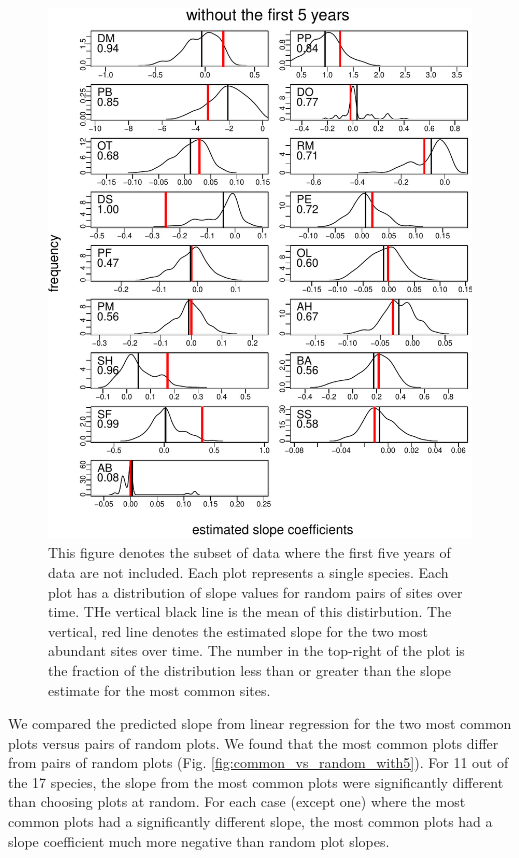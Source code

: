 \documentclass[]{article}
\begin{document}
\begin{figure}[htbp]
\centering
\includegraphics{Empirical_Investigation_files/figure-latex/unnamed-chunk-3-1.pdf}
\caption{This figure denotes the subset of data where the first five
years of data are not included. Each plot represents a single species.
Each plot has a distribution of slope values for random pairs of sites
over time. THe vertical black line is the mean of this distirbution. The
vertical, red line denotes the estimated slope for the two most abundant
sites over time. The number in the top-right of the plot is the fraction
of the distribution less than or greater than the slope estimate for the
most common sites.\label{fig:common_vs_random_without5}}
\end{figure}

We compared the predicted slope from linear regression for the two most
common plots versus pairs of random plots. We found that the most common
plots differ from pairs of random plots (Fig.
\ref{fig:common_vs_random_with5}). For 11 out of the 17 species, the
slope from the most common plots were significantly different than
choosing plots at random. For each case (except one) where the most
common plots had a significantly different slope, the most common plots
had a slope coefficient much more negative than random plot slopes.
\end{document}
